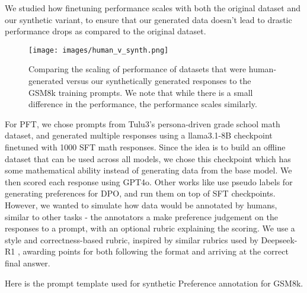We studied how finetuning performance scales with both the original dataset and our synthetic variant, to ensure that our generated data doesn't lead to drastic performance drops as compared to the original dataset. 

\begin{figure}
    \centering
    \texttt{[image: images/human\_v\_synth.png]}
    \caption{Comparing the scaling of performance of datasets that were human-generated versus our synthetically generated responses to the GSM8k training prompts. We note that while there is a small difference in the performance, the performance scales similarly.}
    \label{fig:human_v_synth}
\end{figure}


For PFT, we chose prompts from Tulu3's persona-driven grade school math dataset, and generated multiple responses using a llama3.1-8B checkpoint finetuned with 1000 SFT math responses. Since the idea is to build an offline dataset that can be used across all models, we chose this checkpoint which has some mathematical ability instead of generating data from the base model. We then scored each response using GPT4o. Other works like \citet{jiao2024preferenceoptimizationreasoningpseudo} use pseudo labels for generating preferences for DPO, and run them on top of SFT checkpoints. However, we wanted to simulate how data would be annotated by humans, similar to other tasks - the annotators a make preference judgement on the responses to a prompt, with an optional rubric explaining the scoring. We use a style and correctness-based rubric, inspired by similar rubrics used by Deepseek-R1 \cite{guo2025deepseek}, awarding points for both following the format and arriving at the correct final answer. 

Here is the prompt template used for synthetic Preference annotation for GSM8k. 

